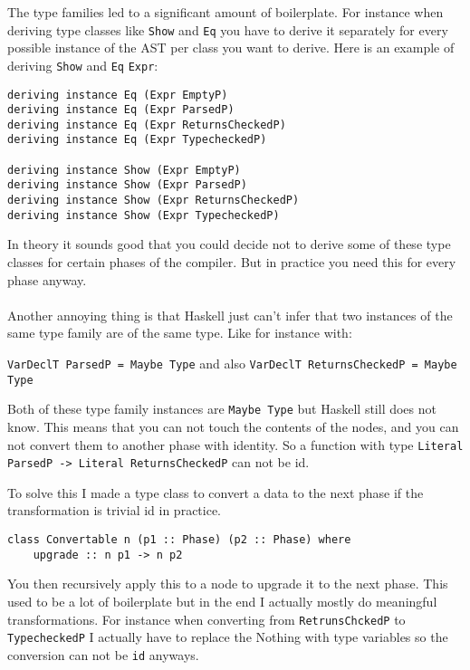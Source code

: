 \documentclass{report}
\begin{document}
\noindent The type families led to a significant amount of boilerplate. For instance when deriving type classes like \texttt{Show} and \texttt{Eq} you have to derive it separately for every possible instance of the AST per class you want to derive. Here is an example of deriving \texttt{Show} and \texttt{Eq} \texttt{Expr}:

\begin{verbatim}
deriving instance Eq (Expr EmptyP)
deriving instance Eq (Expr ParsedP)
deriving instance Eq (Expr ReturnsCheckedP)
deriving instance Eq (Expr TypecheckedP)

deriving instance Show (Expr EmptyP)
deriving instance Show (Expr ParsedP)
deriving instance Show (Expr ReturnsCheckedP)
deriving instance Show (Expr TypecheckedP)
\end{verbatim}

\noindent In theory it sounds good that you could decide not to derive some of these type classes for certain phases of the compiler. But in practice you need this for every phase anyway.
\\\\
Another annoying thing is that Haskell just can’t infer that two instances of the same type family are of the same type. Like for instance with:

\texttt{VarDeclT ParsedP = Maybe Type} and also \texttt{VarDeclT ReturnsCheckedP = Maybe Type}

\noindent Both of these type family instances are \texttt{Maybe Type} but Haskell still does not know. 
This means that you can not touch the contents of the nodes, and you can not convert them to another phase with identity. So a function with type \texttt{Literal ParsedP -> Literal ReturnsCheckedP} can not be id.

To solve this I made a type class to convert a data to the next phase if the transformation is trivial
id in practice.

\begin{verbatim}
class Convertable n (p1 :: Phase) (p2 :: Phase) where
    upgrade :: n p1 -> n p2 
\end{verbatim}

You then recursively apply this to a node to upgrade it to the next phase. This used to be a lot of boilerplate but in the end I actually mostly do meaningful transformations. For instance when converting from \texttt{RetrunsChckedP} to \texttt{TypecheckedP} I actually have to replace the Nothing with type variables so the conversion can not be \texttt{id} anyways. 
\end{document}
